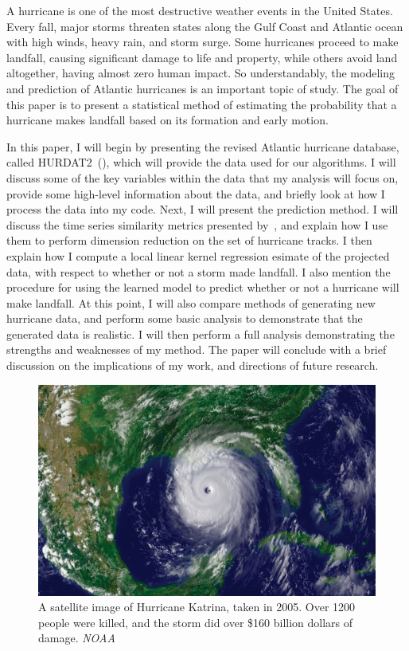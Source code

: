 
\par
A hurricane is one of the most destructive weather events in the United States.
Every fall, major storms threaten states along the Gulf Coast and Atlantic ocean with high winds, heavy rain, and storm surge.
Some hurricanes proceed to make landfall, causing significant damage to life and property, while others avoid land altogether, having almost zero human impact.
So understandably, the modeling and prediction of Atlantic hurricanes is an important topic of study.
The goal of this paper is to present a statistical method of estimating the probability that a hurricane makes landfall based on its formation and early motion.

\par
In this paper, I will begin by presenting the revised Atlantic hurricane database, called HURDAT2~(\cite{landsea2015revised}), which will provide the data used for our algorithms.
I will discuss some of the key variables within the data that my analysis will focus on, provide some high-level information about the data, and briefly look at how I process the data into my code.
Next, I will present the prediction method.
I will discuss the time series similarity metrics presented by~\cite{ho2015manifold}, and explain how I use them to perform dimension reduction on the set of hurricane tracks.
I then explain how I compute a local linear kernel regression esimate of the projected data, with respect to whether or not a storm made landfall.
I also mention the procedure for using the learned model to predict whether or not a hurricane will make landfall.
At this point, I will also compare methods of generating new hurricane data, and perform some basic analysis to demonstrate that the generated data is realistic.
I will then perform a full analysis demonstrating the strengths and weaknesses of my method.
The paper will conclude with a brief discussion on the implications of my work, and directions of future research.

\begin{figure}
	\centering
	\includegraphics[width=\linewidth]{images/katrina_satellite_noaa.jpg}
	\caption{A satellite image of Hurricane Katrina, taken in 2005. Over 1200 people were killed, and the storm did over \$160 billion dollars of damage. \textit{NOAA}}
	\label{fig:katrina_satellite}
\end{figure}

